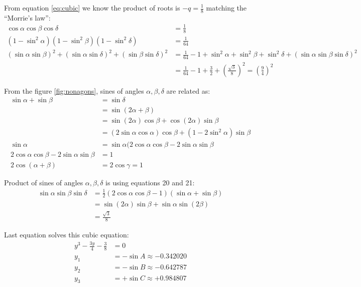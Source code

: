 \documentclass[11pt]{article}
\begin{document}
From equation \ref{eq:cubic} we know the product of roots is $-q = \frac{1}{8}$ matching the ``Morrie's law'':
\begin{align}
\cos\alpha\cos\beta\cos\delta &= \frac{1}{8} \\
(1-\sin^2\alpha)(1-\sin^2\beta)(1-\sin^2\delta) &= \frac{1}{64} \nonumber\\
(\sin\alpha\sin\beta)^2 +(\sin\alpha\sin\delta)^2 +(\sin\beta\sin\delta)^2 &= \frac{1}{64} - 1 +\sin^2\alpha+\sin^2\beta+\sin^2\delta +(\sin\alpha\sin\beta\sin\delta)^2 \nonumber\\
 &= \frac{1}{64} - 1 + \frac{3}{2} +\left(\frac{\sqrt{3}}{8}\right)^2 = \left(\frac{9}{4}\right)^2 
\end{align}

From the figure \ref{fig:nonagons}, sines of angles $\alpha, \beta, \delta$ are related as:
\begin{align}
\sin\alpha + \sin\beta &= \sin\delta \\
 &= \sin(2\alpha + \beta) \nonumber\\
 &= \sin(2\alpha)\cos\beta + \cos(2\alpha)\sin\beta \nonumber\\
 &= (2\sin\alpha\cos\alpha)\cos\beta + (1-2\sin^2\alpha)\sin\beta \nonumber\\
\sin\alpha &= \sin\alpha(2\cos\alpha\cos\beta -2\sin\alpha\sin\beta \nonumber\\
2\cos\alpha\cos\beta -2\sin\alpha\sin\beta &= 1 \\
2\cos(\alpha+\beta) &= 2\cos\gamma = 1\nonumber
\end{align}

Product of sines of angles $\alpha, \beta, \delta$ is using equations 20 and 21:
\begin{align}
\sin\alpha\sin\beta\sin\delta &= \frac{1}{2}(2\cos\alpha\cos\beta - 1)(\sin\alpha + \sin\beta) \nonumber\\
 &= \sin(2\alpha)\sin\beta + \sin\alpha\sin(2\beta) \nonumber\\
 &= \frac{\sqrt{3}}{8}
\end{align}



Last equation solves this cubic equation:
\begin{align*}
y^3 - \frac{3y}{4} - \frac{3}{8} &= 0\\
y_1 &= -\sin{A} \approx -0.342020\\
y_2 &= -\sin{B} \approx -0.642787\\
y_3 &= +\sin{C} \approx +0.984807
\end{align*}
\end{document}
